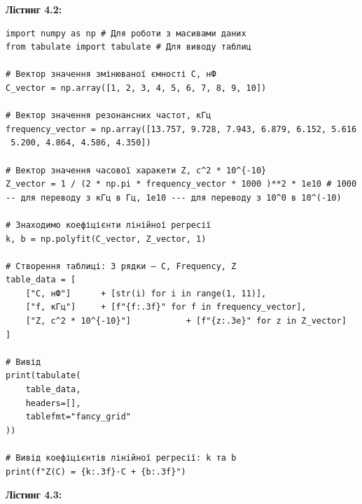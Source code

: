 \documentclass[12pt,a4paper]{article}
\begin{document}
    \textbf{\large Лістинг 4.2:}

    \vspace{1em}

    \small{

    \begin{verbatim}
import numpy as np # Для роботи з масивами даних
from tabulate import tabulate # Для виводу таблиц

# Вектор значення змінюваної ємності C, нФ
C_vector = np.array([1, 2, 3, 4, 5, 6, 7, 8, 9, 10])

# Вектор значення резонансних частот, кГц
frequency_vector = np.array([13.757, 9.728, 7.943, 6.879, 6.152, 5.616
 5.200, 4.864, 4.586, 4.350])

# Вектор значення часової харакети Z, с^2 * 10^{-10}
Z_vector = 1 / (2 * np.pi * frequency_vector * 1000 )**2 * 1e10 # 1000
-- для переводу з кГц в Гц, 1e10 --- для переводу з 10^0 в 10^(-10)

# Знаходимо коефіцієнти лінійної регресії
k, b = np.polyfit(C_vector, Z_vector, 1)

# Створення таблиці: 3 рядки — C, Frequency, Z
table_data = [
    ["C, нФ"]      + [str(i) for i in range(1, 11)],
    ["f, кГц"]     + [f"{f:.3f}" for f in frequency_vector],
    ["Z, с^2 * 10^{-10}"]           + [f"{z:.3e}" for z in Z_vector]
]

# Вивід
print(tabulate(
    table_data,
    headers=[],
    tablefmt="fancy_grid"
))

# Вивід коефіцієнтів лінійної регресії: k та b
print(f"Z(C) = {k:.3f}·C + {b:.3f}")
\end{verbatim}
}

    \vspace{3em}

    \hypertarget{listing3}{}

    \textbf{\large Лістинг 4.3:}

    \vspace{1em}
\end{document}
